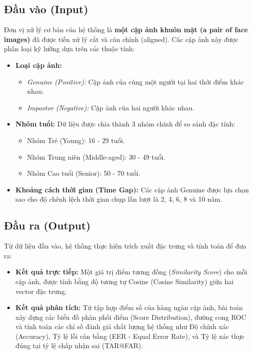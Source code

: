 \subsection{Đầu vào (Input)}
Đơn vị xử lý cơ bản của hệ thống là \textbf{một cặp ảnh khuôn mặt (a pair of face images)} đã được tiền xử lý cắt và căn chỉnh (aligned). Các cặp ảnh này được phân loại kỹ lưỡng dựa trên các thuộc tính:
\begin{itemize}
    \item \textbf{Loại cặp ảnh:}
    \begin{itemize}
        \item \textit{Genuine (Positive):} Cặp ảnh của cùng một người tại hai thời điểm khác nhau.
        \item \textit{Impostor (Negative):} Cặp ảnh của hai người khác nhau.
    \end{itemize}
    \item \textbf{Nhóm tuổi:} Dữ liệu được chia thành 3 nhóm chính để so sánh đặc tính:
    \begin{itemize}
        \item Nhóm Trẻ (Young): 16 - 29 tuổi.
        \item Nhóm Trung niên (Middle-aged): 30 - 49 tuổi.
        \item Nhóm Cao tuổi (Senior): 50 - 70 tuổi.
    \end{itemize}
    \item \textbf{Khoảng cách thời gian (Time Gap):} Các cặp ảnh Genuine được lựa chọn sao cho độ chênh lệch thời gian chụp lần lượt là 2, 4, 6, 8 và 10 năm.
\end{itemize}

\subsection{Đầu ra (Output)}
Từ dữ liệu đầu vào, hệ thống thực hiện trích xuất đặc trưng và tính toán để đưa ra:
\begin{itemize}
    \item \textbf{Kết quả trực tiếp:} Một giá trị điểm tương đồng (\textit{Similarity Score}) cho mỗi cặp ảnh, được tính bằng độ tương tự Cosine (Cosine Similarity) giữa hai vector đặc trưng.
    \item \textbf{Kết quả phân tích:} Từ tập hợp điểm số của hàng ngàn cặp ảnh, bài toán xây dựng các biểu đồ phân phối điểm (Score Distribution), đường cong ROC và tính toán các chỉ số đánh giá chất lượng hệ thống như Độ chính xác (Accuracy), Tỷ lệ lỗi cân bằng (EER - Equal Error Rate), và Tỷ lệ xác thực đúng tại tỷ lệ chấp nhận sai (TAR@FAR).
\end{itemize}



